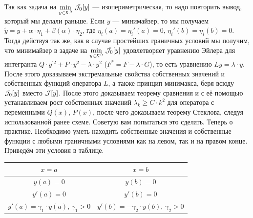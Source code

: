 Так как задача на $\displaystyle\min\limits_{y\in\mathcal{K}^0}\,\mathcal{J}_0[y]$ --- изопериметрическая, то надо повторить вывод, который мы делали раньше. Если $y$ --- минимайзер, то мы получаем $\tilde{y}=y+\alpha\cdot\eta_1+\beta(\alpha)\cdot\eta_2$, где $\eta_i(a)=\eta_i'(a)=0$, $\eta_i'(b)=\eta_i(b)=0$. Тогда действуя так же, как в случае простейших граничных условий мы получим, что минимайзер в задаче на $\displaystyle\min\limits_{y\in\mathcal{K}^0}\,\mathcal{J}_0[y]$ удовлетворяет уравнению Эйлера для интегранта $Q\cdot y^{\prime2}+P\cdot y^2-\lambda\cdot y^2$ ($F^{\ast}=F-\lambda\cdot G$), то есть уравнению $Ly=\lambda\cdot y$. После этого доказываем экстремальные свойства собственных значений и собственных функций оператора $L$, а также принцип минимакса, беря всюду $\mathcal{J}_0[y]$ вместо $\mathcal{J}[y]$. После этого доказываем теорему сравнения и с её помощью устанавливаем рост собственных значений $\lambda_k\geqslant C\cdot k^2$ для оператора с переменными $Q(x)$, $P(x)$, после чего доказываем теорему Стеклова, следуя использованной ранее схеме. Советую вам попытаться это сделать. Теперь о практике. Необходимо уметь находить собственные значения и собственные функции с любыми граничными условиями как на левом, так и на правом конце. Приведём эти условия в таблице.
\begin{center}
	\begin{tabular}{|c|c|}
		\hline
		$x=a$ & $x=b$ \\
		\hline
		$y(a)=0$ & $y(b)=0$ \\
		\hline
		$y'(a)=0$ & $y'(b)=0$ \\
		\hline
		$y'(a)=\gamma_1\cdot y(a)$, $\gamma_1>0$ & $y'(b)=-\gamma_2\cdot y(b)$, $\gamma_2>0$ \\
		\hline
	\end{tabular} 
\end{center}